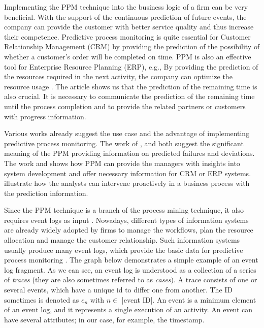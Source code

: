 \documentclass[runningheads]{llncs}
\begin{document}
		Implementing the PPM technique into the business logic of a firm can be very beneficial. With the support of the continuous prediction of future events, the company can provide the customer with better service quality and thus increase their competence. Predictive process monitoring is quite essential for Customer Relationship Management (CRM) by providing the prediction of the possibility of whether a customer's order will be completed on time. PPM is also an effective tool for Enterprise Resource Planning (ERP), e.g., By providing the prediction of the resources required in the next activity, the company can optimize the resource usage \cite{art-13}. The article \cite{art-29} shows us that the prediction of the remaining time is also crucial. It is necessary to communicate the prediction of the remaining time until the process completion and to provide the related partners or customers with progress information.   
		
		Various works already suggest the use case and the advantage of implementing predictive process monitoring. The work of \cite{art-6}, and \cite{art-7} both suggest the significant meaning of the PPM providing information on predicted failures and deviations. The work \cite{art-13} and \cite{art-24} shows how PPM can provide the managers with insights into system development and offer necessary information for CRM or ERP systems. \cite{art-5} illustrate how the analysts can intervene proactively in a business process with the prediction information.
	
		Since the PPM technique is a branch of the process mining technique, it also requires event logs as input \cite{art-15}. Nowadays, different types of information systems are already widely adopted by firms to manage the workflows, plan the resource allocation and manage the customer relationship. Such information systems usually produce many event logs, which provide the basic data for predictive process monitoring \cite{art-5}. The graph below demonstrates a simple example of an event log fragment. As we can see, an event log is understood as a collection of a series of \textit{traces} (they are also sometimes referred to as \textit{cases}). A trace consists of one or several events, which have a unique id to differ one from another. The ID sometimes is denoted as $ e_{n} $ with $ n \in$ |event ID|. An event is a minimum element of an event log, and it represents a single execution of an activity. An event can have several attributes; in our case, for example, the timestamp. 
		
\end{document}

